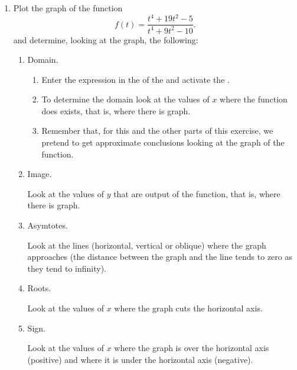 \begin{enumerate}[leftmargin=*]
\item Plot the graph of the function
      \[
      f(t)=\frac{t^{4} +19t^{2} - 5}{t^{4} +9t^{2} - 10}.
      \]
      and determine, looking at the graph, the following:

      \begin{enumerate}
      \item Domain.
            \begin{indication}
            \begin{enumerate}
            \item Enter the expression  in the  of the  and activate the .
            \item To determine the domain look at the values of $x$ where the function does exists, that is, where there is graph.
            \item Remember that, for this and the other parts of this exercise, we pretend to get approximate conclusions looking at the graph of the function.
            \end{enumerate}
            \end{indication}

      \item Image.
            \begin{indication}
            Look at the values of $y$ that are output of the function, that is, where there is graph.
            \end{indication}

      \item Asymtotes.
            \begin{indication}
            Look at the lines (horizontal, vertical or oblique) where the graph approaches (the distance between the graph and the line tends to zero as they tend to infinity).
            \end{indication}

      \item Roots.
            \begin{indication}
            Look at the values of $x$ where the graph cuts the horizontal axis.
            \end{indication}

      \item Sign.
            \begin{indication}
            Look at the values of $x$ where the graph is over the horizontal axis (positive) and where it is under the horizontal axis (negative).
            \end{indication}


\end{enumerate}
\end{enumerate}
